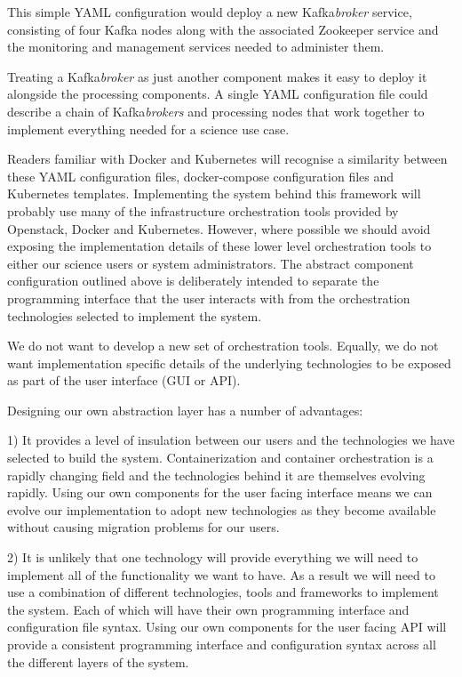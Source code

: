 \documentclass{article}
\newcommand{\yaml} {YAML\xspace}
\newcommand{\docker} {Docker\xspace}
\newcommand{\dockercompose} {docker-compose\xspace}
\newcommand{\kubernetes} {Kubernetes\xspace}
\newcommand{\openstack} {Openstack\xspace}
\newcommand{\kafka} {Kafka\xspace}
\newcommand{\zookeeper} {Zookeeper\xspace}
\newcommand{\kfbroker} {\textit{broker}\xspace}
\newcommand{\kfbrokers} {\textit{brokers}\xspace}
\begin{document}
This simple \yaml configuration would deploy a new \kafka \kfbroker service, consisting of four \kafka nodes along with the associated \zookeeper service and the monitoring and management services needed to administer them.

Treating a \kafka \kfbroker as just another component makes it easy to deploy it alongside the processing components. A single \yaml configuration file could describe a chain of \kafka \kfbrokers and processing nodes that work together to implement everything needed for a science use case.

Readers familiar with \docker and \kubernetes will recognise a similarity between these \yaml configuration files, \dockercompose configuration files and \kubernetes templates.
Implementing the system behind this framework will probably use many of the infrastructure orchestration tools provided by \openstack, \docker and \kubernetes.
However, where possible we should avoid exposing the implementation details of
these lower level orchestration tools to either our science users or system administrators. The abstract component configuration outlined above is deliberately intended to separate the programming interface that the user interacts with from the orchestration technologies selected to implement the system.

We do not want to develop a new set of orchestration tools. Equally, we do not want implementation specific details of the underlying technologies to be exposed as part of the user interface (GUI or API).

Designing our own abstraction layer has a number of advantages:

1) It provides a level of insulation between our users and the technologies we have selected to build the system. Containerization and container orchestration is a rapidly changing field and the technologies behind it are themselves evolving rapidly.
Using our own components for the user facing interface means we can evolve our implementation to adopt new technologies as they become available without causing migration problems for our users.

2) It is unlikely that one technology will provide everything we will need to implement all of the functionality we want to have. As a result we will need to use a combination of different technologies, tools and frameworks to implement the system. Each of which will have their own programming interface and configuration file syntax.
Using our own components for the user facing API will provide a consistent programming interface and configuration syntax across all the different layers of the system.
\end{document}
